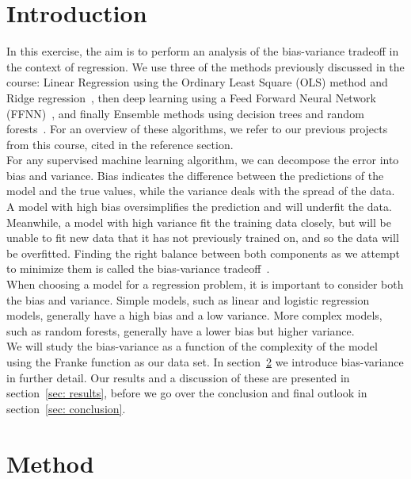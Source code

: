 \documentclass[reprint,english,notitlepage]{revtex4-1}  %
\begin{document}
\section{Introduction}
In this exercise, the aim is to perform an analysis of the bias-variance tradeoff in the context of regression. We use three of the methods previously discussed in the course: Linear Regression using the Ordinary Least Square (OLS) method and Ridge regression~\cite{proj1}, then deep learning using a Feed Forward Neural Network (FFNN)~\cite{proj2}, and finally Ensemble methods using decision trees and random forests~\cite{proj3}. 
For an overview of these algorithms, we refer to our previous projects from this course, cited in the reference section. 
\vspace{3mm}
\\ 
For any supervised machine learning algorithm, we can decompose the error into bias and variance. Bias indicates the difference between the predictions of the model and the true values, while the variance deals with the spread of the data. A model with high bias oversimplifies the prediction and will underfit the data. Meanwhile, a model with high variance fit the training data closely, but will be unable to fit new data that it has not previously trained on, and so the data will be overfitted. 
Finding the right balance between both components as we attempt to minimize them is called the bias-variance tradeoff~\cite{morthen}. 
\vspace{3mm}
\\ 
When choosing a model for a regression problem, it is important to consider both the bias and variance.
Simple models, such as linear and logistic regression models, generally have a high bias and a low variance. More complex models, such as random forests, generally have a lower bias but higher variance. 
\vspace{3mm}
\\ 
We will study the bias-variance as a function of the complexity of the model using the Franke function as our data set. 
In section~\ref{sec: method} we introduce bias-variance in further detail. Our results and a discussion of these are presented in section~\ref{sec: results}, before we go over the conclusion and final outlook in section~\ref{sec: conclusion}. 




\section{Method}\label{sec: method}
\end{document}
